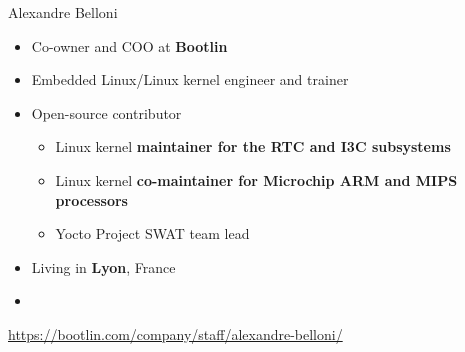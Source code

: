 \begin{frame}{Alexandre Belloni}
    \begin{itemize}
      \item Co-owner and COO at {\bf Bootlin}
      \item Embedded Linux/Linux kernel engineer and trainer
      \item Open-source contributor
        \begin{itemize}
          \item Linux kernel {\bf maintainer for the RTC and I3C subsystems}
          \item Linux kernel {\bf co-maintainer for Microchip ARM and
            MIPS processors}
          \item Yocto Project SWAT team lead
        \end{itemize}
      \item Living in {\bf Lyon}, France
      \item {}
    \end{itemize}
    {\small \url{https://bootlin.com/company/staff/alexandre-belloni/}}
\end{frame}

